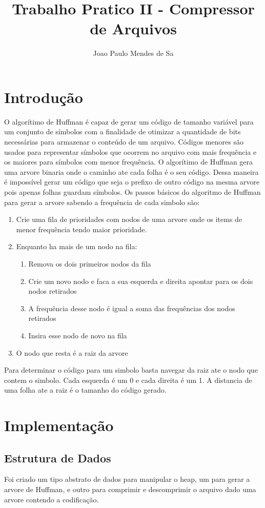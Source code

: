 \documentclass[a4paper, 11pt]{article}
\begin{document}
\title{Trabalho Pratico II - Compressor de Arquivos}
\author{Joao Paulo Mendes de Sa}
\date{}
\maketitle
\section{Introdução}
O algorítimo de Huffman é capaz de gerar um código de tamanho variável para um conjunto de símbolos com a finalidade de otimizar a quantidade de bits necessárias para armazenar o conteúdo de um arquivo. Códigos menores são usados para representar símbolos que ocorrem no arquivo com mais frequência e os maiores para símbolos com menor frequência. O algorítimo de Huffman gera uma arvore binaria onde o caminho ate cada folha é o seu código. Dessa maneira é impossível gerar um código que seja o prefixo de outro código na mesma arvore pois apenas folhas guardam símbolos. Os passos básicos do algoritmo de Huffman para gerar a arvore sabendo a frequência de cada simbolo são:
\begin{enumerate}
\item Crie uma fila de prioridades com nodos de uma arvore onde os items de menor frequência tendo maior prioridade.
\item Enquanto ha mais de um nodo na fila:
\begin{enumerate}
\item Remova os dois primeiros nodos da fila
\item Crie um novo nodo e faca a sua esquerda e direita apontar para os dois nodos retirados
\item A frequência desse nodo é igual a soma das frequências dos nodos retirados
\item Insira esse nodo de novo na fila
\end{enumerate}
\item O nodo que resta é a raiz da arvore
\end{enumerate}
Para determinar o código para um simbolo basta navegar da raiz ate o nodo que contem o simbolo. Cada esquerda é um 0 e cada direita é um 1. A distancia de uma folha ate a raiz é o tamanho do código gerado.

\section{Implementação}
\subsection{Estrutura de Dados}
Foi criado um tipo abstrato de dados para manipular o heap, um para gerar a arvore de Huffman, e outro para comprimir e descomprimir o arquivo dado uma arvore contendo a codificação.
\end{document}
